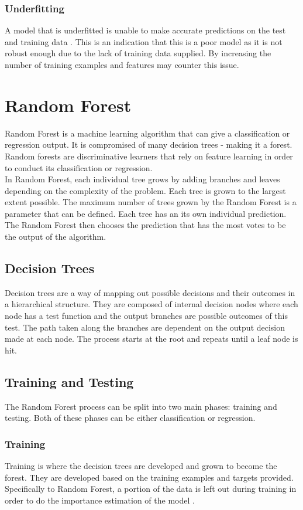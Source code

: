 \subsubsection{Underfitting}
A model that is underfitted is unable to make accurate predictions on the test and training data \cite{ref:ml_1}. This is an indication that this is a poor model as it is not robust enough due to the lack of training data supplied. By increasing the number of training examples and features may counter this issue.   
	
\section{Random Forest}
Random Forest is a machine learning algorithm that can give a classification or regression output. It is compromised of many decision trees - making it a forest.  Random forests are discriminative learners that rely on feature learning in order to conduct its classification or regression. 
\\[1\baselineskip]
In Random Forest, each individual tree grows by adding branches and leaves depending on the complexity of the problem. Each tree is grown to the largest extent possible. The maximum number of trees grown by the Random Forest is a parameter that can be defined. Each tree has an its own individual prediction. The Random Forest then chooses the prediction that has the most votes to be the output of the algorithm. 
\subsection{Decision Trees}
Decision trees are a way of mapping out possible decisions and their outcomes in a hierarchical structure. They are composed of internal decision nodes where each node has a test function and the output branches are possible outcomes of this test. The path taken along the branches are dependent on the output decision made at each node. The process starts at the root and repeats until a leaf node is hit. 

\subsection{Training and Testing}
The Random Forest process can be split into two main phases: training and testing. Both of these phases can be either classification or regression. 

\subsubsection{Training}
Training is where the decision trees are developed and grown to become the forest. They are developed based on the training examples and targets provided. Specifically to Random Forest, a portion of the data is left out during training in order to do the importance estimation of the model \cite{ref:rf_1}.  

